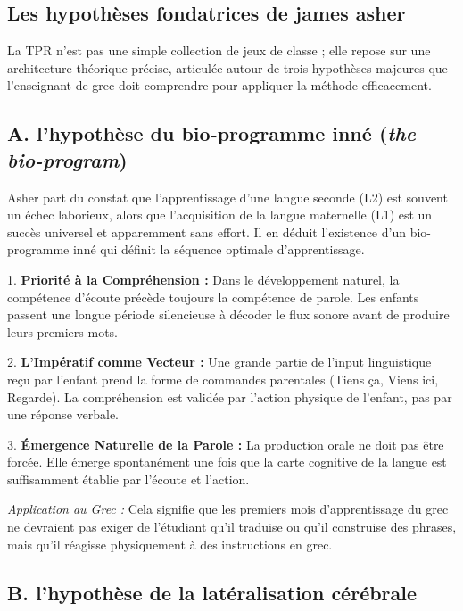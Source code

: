 \subsection{Les hypothèses fondatrices de james asher}

La TPR n'est pas une simple collection de jeux de classe ; elle repose sur une architecture
théorique précise, articulée autour de trois hypothèses majeures que l'enseignant de grec doit
comprendre pour appliquer la méthode efficacement.\cite{III-2-2-ref22}



\subsection{A. l'hypothèse du bio-programme inné (\textit{the bio-program})}

Asher part du constat que l'apprentissage d'une langue seconde (L2) est souvent un échec laborieux,
alors que l'acquisition de la langue maternelle (L1) est un succès universel et apparemment sans
effort. Il en déduit l'existence d'un \og bio-programme\fg{} inné qui définit la séquence optimale
d'apprentissage.\cite{III-2-2-ref16}

1. \textbf{Priorité à la Compréhension :} Dans le développement naturel, la compétence d'écoute
précède toujours la compétence de parole. Les enfants passent une longue \og période
silencieuse\fg{} à décoder le flux sonore avant de produire leurs premiers mots.

2. \textbf{L'Impératif comme Vecteur :} Une grande partie de l'input linguistique reçu par l'enfant
prend la forme de commandes parentales (\og Tiens ça\fg{}, \og Viens ici\fg{}, \og Regarde\fg{}). La
compréhension est validée par l'action physique de l'enfant, pas par une réponse verbale.

3. \textbf{Émergence Naturelle de la Parole :} La production orale ne doit pas être forcée. Elle
émerge spontanément une fois que la carte cognitive de la langue est suffisamment établie par
l'écoute et l'action.

\textit{Application au Grec :} Cela signifie que les premiers mois d'apprentissage du grec ne
devraient pas exiger de l'étudiant qu'il traduise ou qu'il construise des phrases, mais qu'il
réagisse physiquement à des instructions en grec.



\subsection{B. l'hypothèse de la latéralisation cérébrale}

